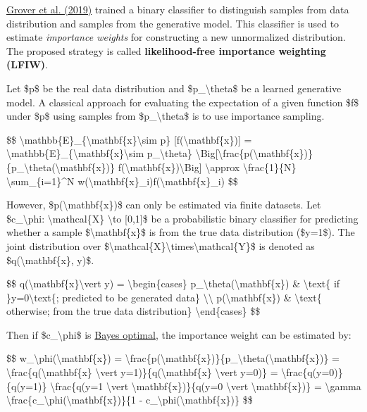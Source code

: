 \href{https://arxiv.org/abs/1906.09531}{Grover et al. (2019)} trained a binary classifier to distinguish samples from data distribution and samples from the generative model. This classifier is used to estimate \emph{importance weights} for constructing a new unnormalized distribution. The proposed strategy is called \textbf{likelihood-free importance weighting (LFIW)}.

Let \$p\$ be the real data distribution and \$p\_\textbackslash theta\$ be a learned generative model. A classical approach for evaluating the expectation of a given function \$f\$ under \$p\$ using samples from \$p\_\textbackslash theta\$ is to use importance sampling.

\$\$ \textbackslash mathbb\{E\}\_\{\textbackslash mathbf\{x\}\textbackslash sim p\} {[}f(\textbackslash mathbf\{x\}){]} = \textbackslash mathbb\{E\}\_\{\textbackslash mathbf\{x\}\textbackslash sim p\_\textbackslash theta\} \textbackslash Big{[}\textbackslash frac\{p(\textbackslash mathbf\{x\})\}\{p\_\textbackslash theta(\textbackslash mathbf\{x\})\} f(\textbackslash mathbf\{x\})\textbackslash Big{]} \textbackslash approx \textbackslash frac\{1\}\{N\} \textbackslash sum\_\{i=1\}\^{}N w(\textbackslash mathbf\{x\}\_i)f(\textbackslash mathbf\{x\}\_i) \$\$

However, \$p(\textbackslash mathbf\{x\})\$ can only be estimated via finite datasets. Let \$c\_\textbackslash phi: \textbackslash mathcal\{X\} \textbackslash to {[}0,1{]}\$ be a probabilistic binary classifier for predicting whether a sample \$\textbackslash mathbf\{x\}\$ is from the true data distribution (\$y=1\$). The joint distribution over \$\textbackslash mathcal\{X\}\textbackslash times\textbackslash mathcal\{Y\}\$ is denoted as \$q(\textbackslash mathbf\{x\}, y)\$.

\$\$ q(\textbackslash mathbf\{x\}\textbackslash vert y) = \textbackslash begin\{cases\} p\_\textbackslash theta(\textbackslash mathbf\{x\}) \& \textbackslash text\{ if \}y=0\textbackslash text\{; predicted to be generated data\} \textbackslash\textbackslash{} p(\textbackslash mathbf\{x\}) \& \textbackslash text\{ otherwise; from the true data distribution\} \textbackslash end\{cases\} \$\$

Then if \$c\_\textbackslash phi\$ is \href{https://svivek.com/teaching/lectures/slides/prob-learning/bayes-optimal-classifier.pdf}{Bayes optimal}, the importance weight can be estimated by:

\$\$ w\_\textbackslash phi(\textbackslash mathbf\{x\}) = \textbackslash frac\{p(\textbackslash mathbf\{x\})\}\{p\_\textbackslash theta(\textbackslash mathbf\{x\})\} = \textbackslash frac\{q(\textbackslash mathbf\{x\} \textbackslash vert y=1)\}\{q(\textbackslash mathbf\{x\} \textbackslash vert y=0)\} = \textbackslash frac\{q(y=0)\}\{q(y=1)\} \textbackslash frac\{q(y=1 \textbackslash vert \textbackslash mathbf\{x\})\}\{q(y=0 \textbackslash vert \textbackslash mathbf\{x\})\} = \textbackslash gamma \textbackslash frac\{c\_\textbackslash phi(\textbackslash mathbf\{x\})\}\{1 - c\_\textbackslash phi(\textbackslash mathbf\{x\})\} \$\$

